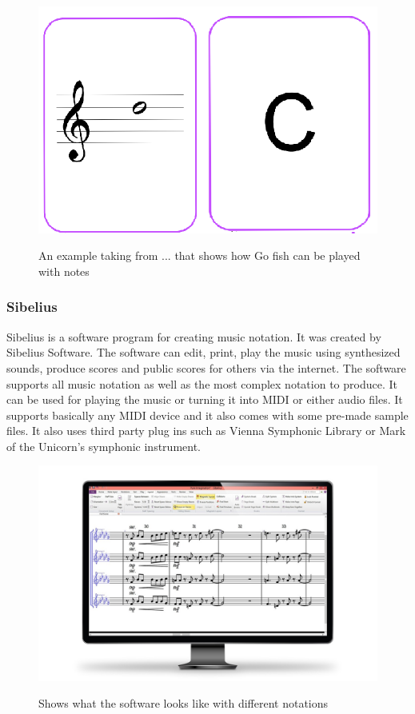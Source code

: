 \begin{figure}[H]
	\centering
	\includegraphics[width=0.7\linewidth]{figure/Analysis/gofish}
	\label{fig:gofish}
	\caption{An example taking from ... that shows how Go fish can be played with notes \cite{GoFish}}
\end{figure}

\subsubsection{Sibelius}
Sibelius is a software program for creating music notation. It was created by Sibelius Software. The software can edit, print, play the music using synthesized sounds, produce scores and public scores for others via the internet. The software supports all music notation as well as the most complex notation to produce. It can be used for playing the music or turning it into MIDI or either audio files. It supports basically any MIDI device and it also comes with some pre-made sample files. It also uses third party plug ins such as Vienna Symphonic Library or Mark of the Unicorn’s symphonic instrument. \cite{Sibelius}

\begin{figure}[H]
	\centering
	\includegraphics[width=0.7\linewidth]{figure/Analysis/Sibelius}
	\label{fig:sibelius}
	\caption{Shows what the software looks like with different notations \cite{Sibelius}}
\end{figure}

